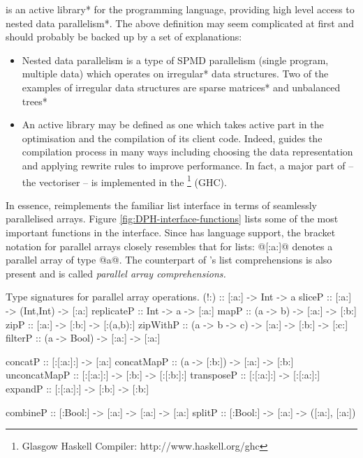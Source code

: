 \documentclass[preamble.tex]{subfiles}
\begin{document}
\idph{} is an \*active library* for the \Haskell programming language, providing high level access to \*nested data parallelism*. The above definition may seem complicated at first and should probably be backed up by a set of explanations:
\begin{itemize}
\item Nested data parallelism is a type of SPMD parallelism (single program, multiple data) which operates on \*irregular* data structures. Two of the examples of irregular data structures are \*sparse matrices* and \*unbalanced trees*

\item An active library may be defined as one which takes active part in the optimisation and the compilation of its client code. Indeed, \DPH guides the compilation process in many ways including choosing the data representation \cite{CDL09} and applying rewrite rules \cite{PTH01} to improve performance. In fact, a major part of \DPH -- the vectoriser -- is implemented in the \footnote{Glasgow Haskell Compiler: http://www.haskell.org/ghc} (GHC).

\end{itemize}
In essence, \DPH reimplements the familiar list interface in terms of seamlessly parallelised arrays. Figure \ref{fig:DPH-interface-functions} lists some of the most important functions in the \DPH interface. Since \DPH has language support, the bracket notation for parallel arrays closely resembles that for \Haskell lists: @[:a:]@ denotes a parallel array of type @a@. The counterpart of \Haskell's list comprehensions is also present and is called \emph{parallel array comprehensions.}

\begin{hscode2}{Type signatures for parallel array operations. \label{fig:DPH-interface-functions}}
(!:)         :: [:a:] -> Int -> a
sliceP       :: [:a:] -> (Int,Int) -> [:a:]
replicateP   :: Int -> a -> [:a:]
mapP         :: (a -> b) -> [:a:] -> [:b:]
zipP         :: [:a:] -> [:b:] -> [:(a,b):]
zipWithP     :: (a -> b -> c) -> [:a:] -> [:b:] -> [:c:]
filterP      :: (a -> Bool) -> [:a:] -> [:a:]

concatP      :: [:[:a:]:] -> [:a:]
concatMapP   :: (a -> [:b:]) -> [:a:] -> [:b:]
unconcatMapP :: [:[:a:]:] -> [:b:] -> [:[:b:]:]
transposeP   :: [:[:a:]:] -> [:[:a:]:]
expandP      :: [:[:a:]:] -> [:b:] -> [:b:]

combineP     :: [:Bool:] -> [:a:] -> [:a:] -> [:a:]
splitP       :: [:Bool:] -> [:a:] -> ([:a:], [:a:])
\end{hscode2}
\end{document}
